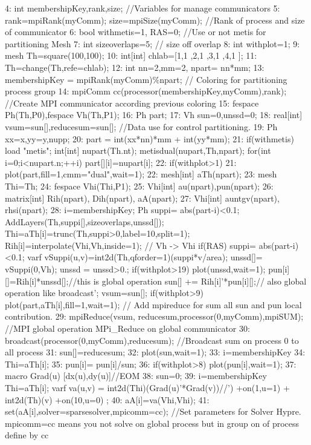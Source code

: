 \documentclass[a4paper,twoside,12pt]{book}
\begin{document}
\begin{example}
4: int membershipKey,rank,size; //Variables for manage communicators
5: rank=mpiRank(myComm); size=mpiSize(myComm); //Rank of process and size of communicator
6: bool withmetis=1, RAS=0; //Use or not metis for partitioning Mesh
7: int sizeoverlaps=5; // size off overlap
8: int withplot=1;
9: mesh Th=square(100,100);
10: int[int] chlab=[1,1  ,2,1  ,3,1  ,4,1  ];
11: Th=change(Th,refe=chlab);
12: int nn=2,mm=2, npart= nn*mm;
13: membershipKey = mpiRank(myComm)\%npart; // Coloring for partitioning process group
14: mpiComm cc(processor(membershipKey,myComm),rank); //Create MPI communicator according previous coloring
15: fespace Ph(Th,P0),fespace Vh(Th,P1);
16: Ph  part;
17: Vh  sun=0,unssd=0;
18: real[int] vsum=sun[],reducesum=sun[]; //Data use for control partitioning.
19: Ph xx=x,yy=y,nupp;
20: part = int(xx*nn)*mm + int(yy*mm);
21: if(withmetis)
    {
    load "metis";
    int[int] nupart(Th.nt);
    metisdual(nupart,Th,npart);
    for(int i=0;i<nupart.n;++i)
      part[][i]=nupart[i];
    }
22: if(withplot>1)
21: plot(part,fill=1,cmm="dual",wait=1);
22: mesh[int] aTh(npart);
23: mesh Thi=Th;
24: fespace Vhi(Thi,P1);
25: Vhi[int] au(npart),pun(npart);
26: matrix[int] Rih(npart), Dih(npart), aA(npart);
27: Vhi[int] auntgv(npart), rhsi(npart);
28: i=membershipKey;
    Ph suppi= abs(part-i)<0.1;
    AddLayers(Th,suppi[],sizeoverlaps,unssd[]);
    Thi=aTh[i]=trunc(Th,suppi>0,label=10,split=1);
    Rih[i]=interpolate(Vhi,Vh,inside=1); //  Vh -> Vhi
    if(RAS)
      {
        suppi= abs(part-i)<0.1;
        varf vSuppi(u,v)=int2d(Th,qforder=1)(suppi*v/area);
        unssd[]= vSuppi(0,Vh);
        unssd = unssd>0.;
        if(withplot>19)
          plot(unssd,wait=1);
      }
    pun[i][]=Rih[i]*unssd[];//this is global operation
    sun[] += Rih[i]'*pun[i][];// also global operation like broadcast';
    vsum=sun[];
    if(withplot>9)
      plot(part,aTh[i],fill=1,wait=1);
 // Add mpireduce for sum all sun and pun local contribution.
29: mpiReduce(vsum, reducesum,processor(0,myComm),mpiSUM); //MPI global operation MPi\_Reduce on global communicator
30: broadcast(processor(0,myComm),reducesum); //Broadcast sum on process 0 to all process
31: sun[]=reducesum;
32: plot(sun,wait=1);
33: i=membershipKey
34: Thi=aTh[i];
35: pun[i]= pun[i]/sun;
36: if(withplot>8)  plot(pun[i],wait=1);
37: macro Grad(u) [dx(u),dy(u)]//EOM
38: sun=0;
39: i=membershipKey
    Thi=aTh[i];
    varf va(u,v) =
      int2d(Thi)(Grad(u)'*Grad(v))//')
      +on(1,u=1) + int2d(Th)(v)
      +on(10,u=0) ;
40: aA[i]=va(Vhi,Vhi);
41: set(aA[i],solver=sparsesolver,mpicomm=cc); //Set parameters for Solver Hypre. mpicomm=cc means you not solve on global process but in group on of process define by cc

\end{example}
\end{document}
